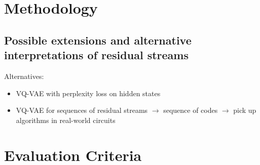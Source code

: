\documentclass[11pt]{scrartcl}
\begin{document}
\section{Methodology}

\subsection{Possible extensions and alternative interpretations of residual streams}

\color{blue}
Alternatives:
\begin{itemize}
\item VQ-VAE with perplexity loss on hidden states
\item VQ-VAE for sequences of residual streams $\rightarrow$ sequence of codes $\rightarrow$ pick up algorithms in real-world circuits
\end{itemize}
\color{black}

\section{Evaluation Criteria}

\printbibliography %
\end{document}
